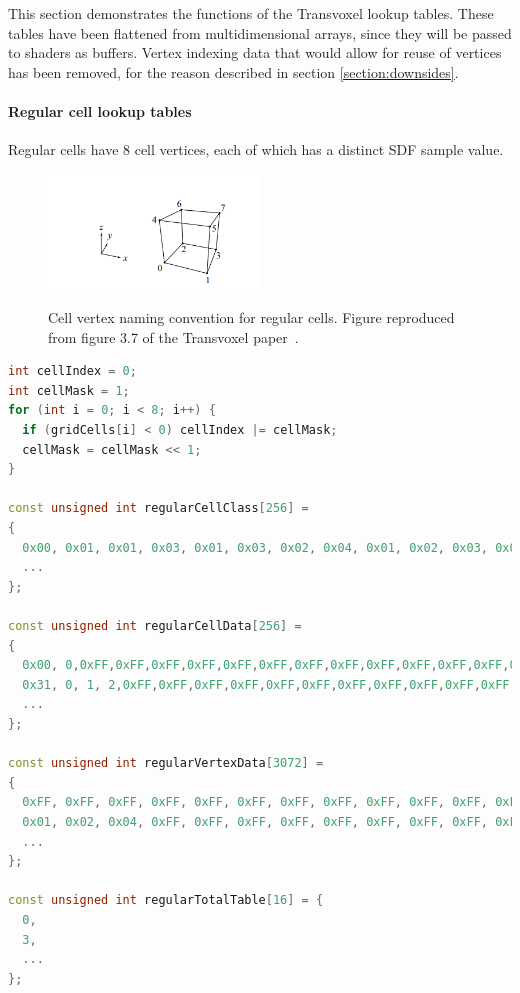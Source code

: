 \documentclass[11pt]{article}
\begin{document}
This section demonstrates the functions of the Transvoxel lookup tables. These tables have been flattened from multidimensional arrays, since they will be passed to shaders as buffers. Vertex indexing data that would allow for reuse of vertices has been removed, for the reason described in section \ref{section:downsides}.

\paragraph{Regular cell lookup tables}
Regular cells have 8 cell vertices, each of which has a distinct SDF sample value.

\begin{figure}
  \caption{Cell vertex naming convention for regular cells. Figure reproduced from figure 3.7 of the Transvoxel paper~\cite{lengyel_2010}.}
  \includegraphics[width=0.5\textwidth]{tv_labels.PNG}
  \label{fig:tv_labels}
\end{figure}

\begin{lstlisting}[language=C++,label={tv_tables},caption={Calculation of \texttt{cellIndex}, and lookup tables, for regular cells. An example of their usage is given below.}]
int cellIndex = 0;
int cellMask = 1;
for (int i = 0; i < 8; i++) {
  if (gridCells[i] < 0) cellIndex |= cellMask;
  cellMask = cellMask << 1;
}

const unsigned int regularCellClass[256] =
{
  0x00, 0x01, 0x01, 0x03, 0x01, 0x03, 0x02, 0x04, 0x01, 0x02, 0x03, 0x04, 0x03, 0x04, 0x04, 0x03,
  ...
};

const unsigned int regularCellData[256] =
{
  0x00, 0,0xFF,0xFF,0xFF,0xFF,0xFF,0xFF,0xFF,0xFF,0xFF,0xFF,0xFF,0xFF,0xFF,0xFF,
  0x31, 0, 1, 2,0xFF,0xFF,0xFF,0xFF,0xFF,0xFF,0xFF,0xFF,0xFF,0xFF,0xFF,0xFF,
  ...
};

const unsigned int regularVertexData[3072] =
{
  0xFF, 0xFF, 0xFF, 0xFF, 0xFF, 0xFF, 0xFF, 0xFF, 0xFF, 0xFF, 0xFF, 0xFF,
  0x01, 0x02, 0x04, 0xFF, 0xFF, 0xFF, 0xFF, 0xFF, 0xFF, 0xFF, 0xFF, 0xFF,
  ...
};

const unsigned int regularTotalTable[16] = {
  0,
  3,
  ...
};
\end{lstlisting}
\end{document}

